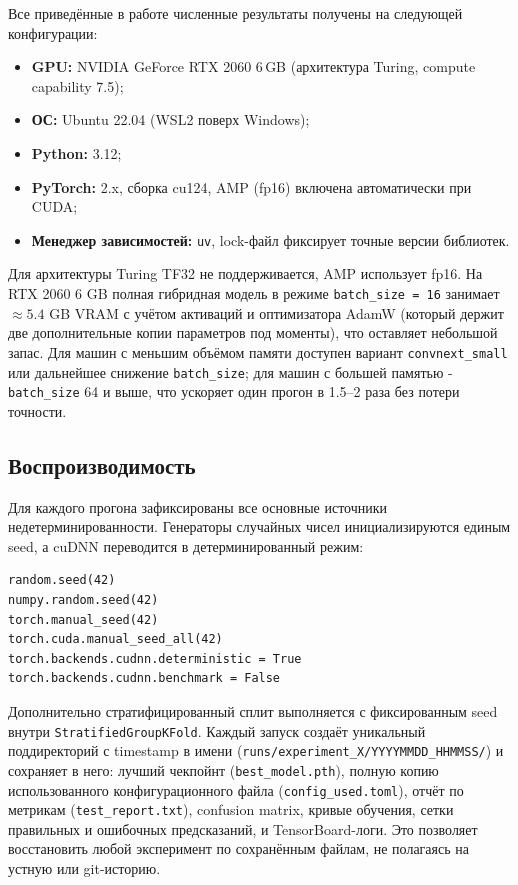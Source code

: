 \documentclass[14pt,a4paper]{extreport}
\begin{document}
Все приведённые в работе численные результаты получены на следующей
конфигурации:
\begin{itemize}
    \item \textbf{GPU:} NVIDIA GeForce RTX 2060 6\,GB (архитектура Turing,
          compute capability 7.5);
    \item \textbf{ОС:} Ubuntu 22.04 (WSL2 поверх Windows);
    \item \textbf{Python:} 3.12;
    \item \textbf{PyTorch:} 2.x, сборка cu124, AMP (fp16) включена
          автоматически при CUDA;
    \item \textbf{Менеджер зависимостей:} \texttt{uv}, lock-файл фиксирует
          точные версии библиотек.
\end{itemize}
Для архитектуры Turing TF32 не поддерживается, AMP использует fp16. На
RTX 2060 6 GB полная гибридная модель в режиме \texttt{batch\_size = 16}
занимает $\approx 5.4$ GB VRAM с учётом активаций и оптимизатора AdamW
(который держит две дополнительные копии параметров под моменты), что
оставляет небольшой запас. Для машин с меньшим объёмом памяти доступен
вариант \texttt{convnext\_small} или дальнейшее снижение
\texttt{batch\_size}; для машин с большей памятью - \texttt{batch\_size}
64 и выше, что ускоряет один прогон в 1.5--2 раза без потери точности.

\subsection{Воспроизводимость}

Для каждого прогона зафиксированы все основные источники
недетерминированности. Генераторы случайных чисел инициализируются
единым seed, а cuDNN переводится в детерминированный режим:
\begin{lstlisting}
random.seed(42)
numpy.random.seed(42)
torch.manual_seed(42)
torch.cuda.manual_seed_all(42)
torch.backends.cudnn.deterministic = True
torch.backends.cudnn.benchmark = False
\end{lstlisting}
Дополнительно стратифицированный сплит выполняется с фиксированным seed
внутри \texttt{StratifiedGroupKFold}.
Каждый запуск создаёт уникальный поддиректорий с timestamp в имени
(\texttt{runs/experiment\_X/YYYYMMDD\_HHMMSS/}) и сохраняет в него:
лучший чекпойнт (\texttt{best\_model.pth}), полную копию использованного
конфигурационного файла (\texttt{config\_used.toml}), отчёт по метрикам
(\texttt{test\_report.txt}), confusion matrix, кривые обучения,
сетки правильных и ошибочных предсказаний, и TensorBoard-логи. Это
позволяет восстановить любой эксперимент по сохранённым файлам, не
полагаясь на устную или git-историю.
\end{document}
